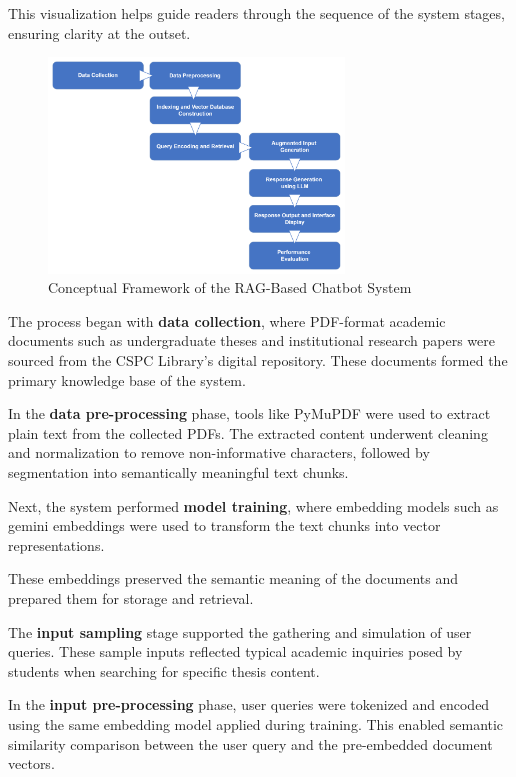 \begin{refsection}
This visualization helps guide readers through the sequence of the system stages, ensuring clarity at the outset.

\begin{figure}[H]
    \centering
    \includegraphics[width=0.7\textwidth]{figures/framework.png}
    \caption{Conceptual Framework of the RAG-Based Chatbot System}
    \label{fig:conceptual_framework}
\end{figure}

The process began with \textbf{data collection}, where PDF-format academic documents such as undergraduate theses and institutional research papers were sourced from the CSPC Library’s digital repository. These documents formed the primary knowledge base of the system.

In the \textbf{data pre-processing} phase, tools like PyMuPDF were used to extract plain text from the collected PDFs. The extracted content underwent cleaning and normalization to remove non-informative characters, followed by segmentation into semantically meaningful text chunks.

Next, the system performed \textbf{model training}, where embedding models such as gemini embeddings were used to transform the text chunks into vector representations.


These embeddings preserved the semantic meaning of the documents and prepared them for storage and retrieval.

The \textbf{input sampling} stage supported the gathering and simulation of user queries. These sample inputs reflected typical academic inquiries posed by students when searching for specific thesis content.

In the \textbf{input pre-processing} phase, user queries were tokenized and encoded using the same embedding model applied during training. This enabled semantic similarity comparison between the user query and the pre-embedded document vectors.


\end{refsection}

